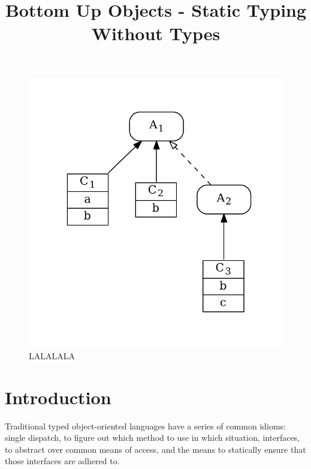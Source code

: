 \documentclass[preprint]{sigplanconf}
\begin{document}
\title{Bottom Up Objects - Static Typing Without Types} 
\maketitle

\begin{figure}
\centering
\includegraphics[scale=.6]{example2.pdf}
\caption{LALALALA}
\label{fig:algo}
\end{figure}

\section{Introduction}

Traditional typed object-oriented languages have a series of
common idioms: single dispatch, to figure out which method
to use in which situation, interfaces, to abstract over 
common means of access, and the means to statically
ensure that those interfaces are adhered to.
\end{document}

